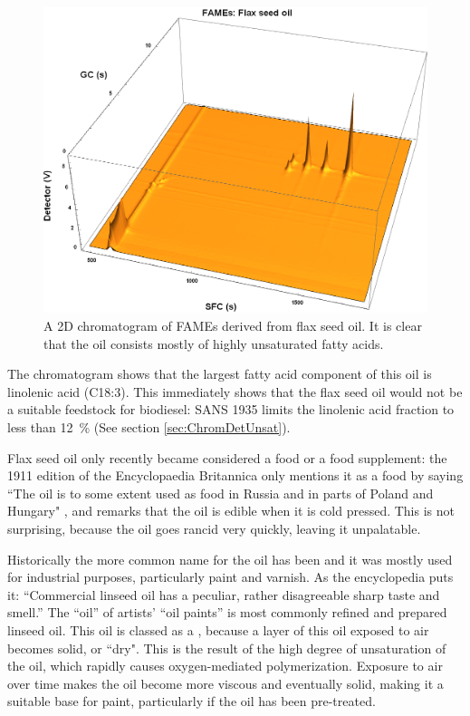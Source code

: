 \begin{figure}
\centering
\includegraphics[width=\textwidth]{Figures/Flax44.png}
\decoRule

\caption[SFC×GC of flax seed oil]{A 2D chromatogram of FAMEs derived from
flax seed oil. It is clear that the oil consists mostly of highly unsaturated fatty
acids.}

\label{fig:2DFlax}
\end{figure}

The chromatogram shows that the largest fatty acid component of this oil is
linolenic acid (C18:3). This immediately shows that the flax seed oil would not
be a suitable feedstock for biodiesel: SANS 1935 limits the linolenic acid
fraction to less than \SI{12}{\percent} (See section \ref{sec:ChromDetUnsat}).

Flax seed oil only recently became considered a food or a food supplement: the
1911 edition of the Encyclopaedia Britannica only mentions it as a food by
saying ``The oil is to some extent used as food in Russia and in parts of Poland
and Hungary" \autocite{Linseed1911}, and remarks that the oil is edible when it
is cold pressed. This is not surprising, because the oil goes rancid very
quickly, leaving it unpalatable.

Historically the more common name for the oil has been  and
it was mostly used for industrial purposes, particularly paint and varnish.
As the encyclopedia puts it: ``Commercial linseed oil has a peculiar, rather
disagreeable sharp taste and smell.'' The ``oil'' of artists' ``oil paints'' is
most commonly refined and prepared linseed oil. This oil is classed as a
, because a layer of this oil exposed to air becomes solid,
or ``dry". This is the result of the high degree of unsaturation of the oil,
which rapidly causes oxygen-mediated polymerization. Exposure to air over time
makes the oil become more viscous and eventually solid, making it a suitable
base for paint, particularly if the oil has been pre-treated.

